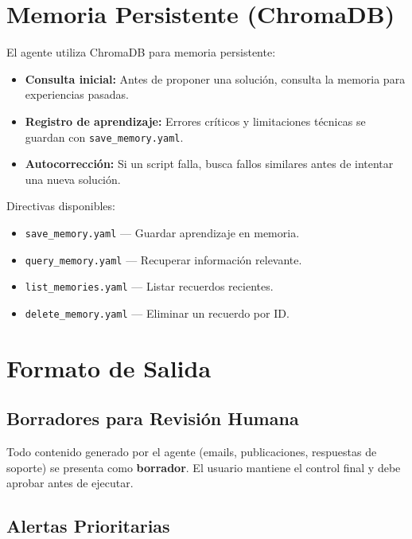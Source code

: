\documentclass[a4paper,12pt]{article}
\begin{document}
\section{Memoria Persistente (ChromaDB)}

El agente utiliza ChromaDB para memoria persistente:

\begin{itemize}
    \item \textbf{Consulta inicial:} Antes de proponer una solución, consulta la memoria para experiencias pasadas.
    \item \textbf{Registro de aprendizaje:} Errores críticos y limitaciones técnicas se guardan con \texttt{save\_memory.yaml}.
    \item \textbf{Autocorrección:} Si un script falla, busca fallos similares antes de intentar una nueva solución.
\end{itemize}

Directivas disponibles:

\begin{itemize}
    \item \texttt{save\_memory.yaml} --- Guardar aprendizaje en memoria.
    \item \texttt{query\_memory.yaml} --- Recuperar información relevante.
    \item \texttt{list\_memories.yaml} --- Listar recuerdos recientes.
    \item \texttt{delete\_memory.yaml} --- Eliminar un recuerdo por ID.
\end{itemize}

\section{Formato de Salida}

\subsection{Borradores para Revisión Humana}

Todo contenido generado por el agente (emails, publicaciones, respuestas de soporte) se presenta como \textbf{borrador}. El usuario mantiene el control final y debe aprobar antes de ejecutar.

\subsection{Alertas Prioritarias}
\end{document}
